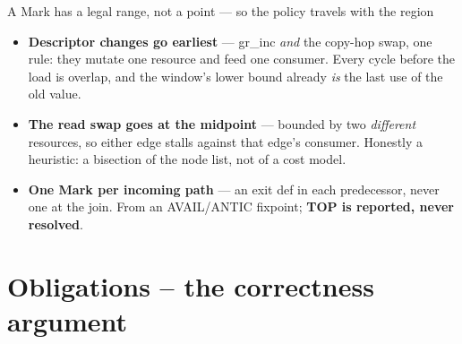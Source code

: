 \documentclass[aspectratio=169,9pt]{beamer}
\newcommand{\key}[1]{\textcolor{acc}{\textbf{#1}}}
\newcommand{\bad}[1]{\textcolor{warn}{\textbf{#1}}}
\begin{document}
\begin{frame}{A Mark has a legal range, not a point --- so the policy travels with the region}
\begin{itemize}\footnotesize
  \item \key{Descriptor changes go earliest} --- gr\_inc \emph{and} the copy-hop swap, one rule: they mutate one resource and feed one consumer. Every cycle before the load is overlap, and the window's lower bound already \emph{is} the last use of the old value.
  \item \key{The read swap goes at the midpoint} --- bounded by two \emph{different} resources, so either edge stalls against that edge's consumer. Honestly a heuristic: a bisection of the node list, not of a cost model.
  \item \key{One Mark per incoming path} --- an exit def in each predecessor, never one at the join. From an AVAIL/ANTIC fixpoint; \bad{TOP is reported, never resolved}.
\end{itemize}
\end{frame}

\section{Obligations -- the correctness argument}
\end{document}
